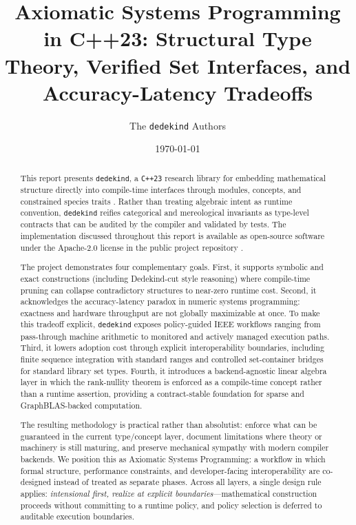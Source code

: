 \documentclass[11pt, a4paper]{report}
\title{Axiomatic Systems Programming in C++23: Structural Type Theory, Verified Set Interfaces, and Accuracy-Latency Tradeoffs}
\author{The \texttt{dedekind} Authors}
\date{\today} %
\begin{document}
\maketitle

\begin{abstract}
This report presents \texttt{dedekind}, a \texttt{C++23} research library for embedding mathematical structure directly into compile-time interfaces through modules, concepts, and constrained species traits \cite{dedekind2026}. 
Rather than treating algebraic intent as runtime convention, \texttt{dedekind} reifies categorical and mereological invariants as type-level contracts that can be audited by the compiler and validated by tests.
The implementation discussed throughout this report is available as open-source software under the Apache-2.0 license in the public project repository \cite{dedekind2026}. 

The project demonstrates four complementary goals. First, it supports symbolic and exact constructions (including Dedekind-cut style reasoning) where compile-time pruning can collapse contradictory structures to near-zero runtime cost. Second, it acknowledges the accuracy-latency paradox in numeric systems programming: exactness and hardware throughput are not globally maximizable at once. To make this tradeoff explicit, \texttt{dedekind} exposes policy-guided IEEE workflows ranging from pass-through machine arithmetic to monitored and actively managed execution paths. Third, it lowers adoption cost through explicit interoperability boundaries, including finite sequence integration with standard ranges and controlled set-container bridges for standard library set types. Fourth, it introduces a backend-agnostic linear algebra layer in which the rank-nullity theorem is enforced as a compile-time concept rather than a runtime assertion, providing a contract-stable foundation for sparse and GraphBLAS-backed computation.

The resulting methodology is practical rather than absolutist: enforce what can be guaranteed in the current type/concept layer, document limitations where theory or machinery is still maturing, and preserve mechanical sympathy with modern compiler backends. We position this as Axiomatic Systems Programming: a workflow in which formal structure, performance constraints, and developer-facing interoperability are co-designed instead of treated as separate phases. Across all layers, a single design rule applies: \emph{intensional first, realize at explicit boundaries}---mathematical construction proceeds without committing to a runtime policy, and policy selection is deferred to auditable execution boundaries.

\end{abstract}
\end{document}
